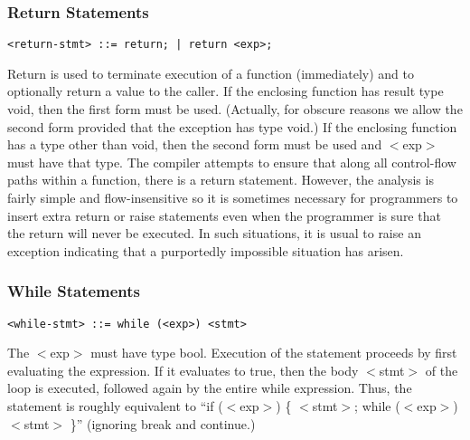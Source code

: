 \documentclass[titlepage,10pt]{article}
\begin{document}
\subsubsection{Return Statements}


\begin{verbatim}
<return-stmt> ::= return; | return <exp>;
\end{verbatim}

Return is used to terminate execution of a function (immediately) and to
optionally return a value to the caller.  If the enclosing function has
result type void, then the first form must be used.  (Actually, for
obscure reasons we allow the second form provided that the exception has
type void.)  If the enclosing function has a type other than void, then
the second form must be used and $<$exp$>$ must have that type.   The
compiler attempts to ensure that along all control-flow paths within a
function, there is a return statement.  However, the analysis is fairly
simple and flow-insensitive so it is sometimes necessary for programmers
to insert extra return or raise statements even when the programmer is
sure that the return will never be executed.   In such situations, it is
usual to raise an exception indicating that a purportedly impossible
situation has arisen.

\subsubsection{While Statements}


\begin{verbatim}
<while-stmt> ::= while (<exp>) <stmt>
\end{verbatim}

The $<$exp$>$ must have type bool.  Execution of the statement proceeds
by first evaluating the expression.  If it evaluates to true, then the
body $<$stmt$>$ of the loop is executed, followed again by the entire
while expression.   Thus, the statement is roughly equivalent to ``if
($<$exp$>$) \{ $<$stmt$>$; while ($<$exp$>$) $<$stmt$>$ \}'' (ignoring
break and continue.)
\end{document}
